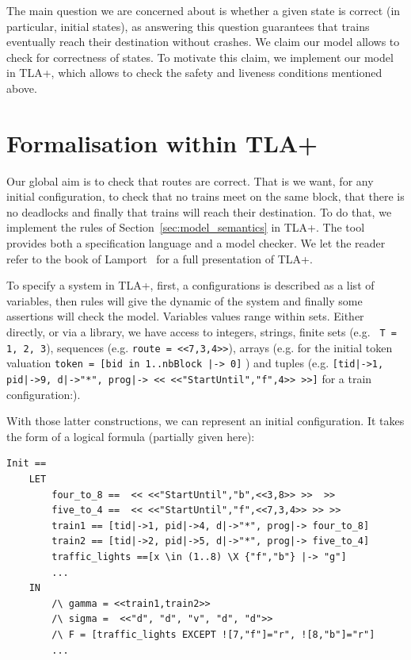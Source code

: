 \documentclass[runningheads]{llncs}
\begin{document}
The main question we are concerned about is whether a given state is correct (in particular, initial states), as answering this question guarantees that trains eventually reach their destination without crashes. We claim our model allows to check for correctness of states. To motivate this claim, we implement our model in TLA+, which allows to check the safety and liveness conditions mentioned above.

\section{Formalisation within TLA+}
\label{sec:tla-formalisation}

Our global aim is to check that routes are correct. That is we want, for any initial configuration, to check that no trains meet on the same block, that there is no deadlocks and finally  that trains will reach their destination. To do that, we implement the rules of Section~\ref{sec:model_semantics} in TLA+. The tool provides both a specification language and a model checker. We let the reader refer to the book of Lamport~\cite{Lamport} for a full presentation of TLA+. 

To specify a system in TLA+, first, a configurations is described as a list of variables, then rules  will give the dynamic of the system and finally some assertions  will check the model.  Variables values range within sets. Either directly, or via a library, we have access to integers, strings, finite sets (e.g. \texttt{ T = {1, 2, 3}}), sequences (e.g. \texttt{route = <<7,3,4>>}),  arrays (e.g. for the initial token valuation \texttt{token = [bid in 1..nbBlock |-> 0]} ) and tuples (e.g. \texttt{[tid|->1, pid|->9, d|->"*", prog|-> << <<"StartUntil","f",4>> >>]}  for a train configuration:).

With those latter constructions, we can represent an initial configuration. It takes the form of a logical formula (partially given here):
\begin{verbatim}
Init == 
    LET 
        four_to_8 ==  << <<"StartUntil","b",<<3,8>> >>  >>
        five_to_4 ==  << <<"StartUntil","f",<<7,3,4>> >> >>
        train1 == [tid|->1, pid|->4, d|->"*", prog|-> four_to_8]
        train2 == [tid|->2, pid|->5, d|->"*", prog|-> five_to_4]
        traffic_lights ==[x \in (1..8) \X {"f","b"} |-> "g"]
        ...
    IN
        /\ gamma = <<train1,train2>>
        /\ sigma =  <<"d", "d", "v", "d", "d">> 
        /\ F = [traffic_lights EXCEPT ![7,"f"]="r", ![8,"b"]="r"]
        ...
\end{verbatim}
\end{document}
